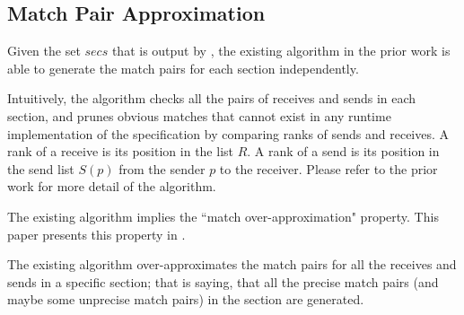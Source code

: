 \subsection{Match Pair Approximation}

Given the set $\mathit{secs}$ that is output by , the existing algorithm in the prior work \cite{DBLP:conf/kbse/HuangMM13} is able to generate the match pairs for each section independently. 

Intuitively, the algorithm checks all the pairs of receives and sends in each section, and prunes obvious matches that cannot exist in any runtime implementation of the specification by comparing ranks of sends and receives. 
A rank of a receive is its position in the list $R$. 
A rank of a send is its position in the send list $S(p)$ from the sender $p$ to the receiver.    
Please refer to the prior work \cite{DBLP:conf/kbse/HuangMM13} for more detail of the algorithm. 


The existing algorithm implies the ``match over-approximation" property. This paper presents this property in . 

\begin{lemma}
The existing algorithm \cite{DBLP:conf/kbse/HuangMM13} over-approximates the match pairs for all the receives and sends in a specific section; that is saying, that all the precise match pairs (and maybe some unprecise match pairs) in the section are generated.
\label{lemma:match}
\end{lemma}



